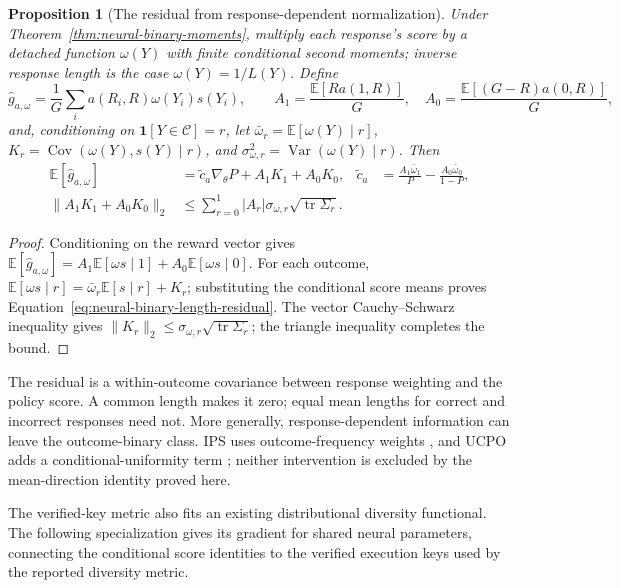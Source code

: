 \documentclass{article}
\newcommand{\enforcehalffinalproseline}{%
  \setlength{\parfillskip}{0pt plus .20\linewidth}}
\newcommand{\1}{\mathbf 1}
\newcommand{\E}{\mathbb E}
\newtheorem{proposition}[lemma]{Proposition}
\theoremstyle{remark}
\theoremstyle{definition}
\theoremstyle{plain}
\begin{document}
\begin{proposition}[The residual from response-dependent normalization]
\enforcehalffinalproseline
\label{prop:neural-binary-length-residual}
Under Theorem~\ref{thm:neural-binary-moments}, multiply each response's score
by a detached function $\omega(Y)$ with finite conditional second moments;
inverse response length is the case $\omega(Y)=1/L(Y)$. Define
\[
 \widehat g_{a,\omega}
 =\frac1G\sum_i a(R_i,R)\omega(Y_i)s(Y_i),\qquad
 A_1=\frac{\E[R a(1,R)]}{G},\quad
 A_0=\frac{\E[(G-R)a(0,R)]}{G},
\]
and, conditioning on $\1[Y\in\mathcal C]=r$, let
$\bar\omega_r=\E[\omega(Y)\mid r]$,
$K_r=\operatorname{Cov}(\omega(Y),s(Y)\mid r)$, and
$\sigma_{\omega,r}^2=\operatorname{Var}(\omega(Y)\mid r)$.
Then
\begin{align}
 \E[\widehat g_{a,\omega}]
 &=\widetilde c_a\nabla_\theta P+A_1K_1+A_0K_0,
 &\widetilde c_a&=\frac{A_1\bar\omega_1}{P}
                  -\frac{A_0\bar\omega_0}{1-P},
 \label{eq:neural-binary-length-residual}\\
 \|A_1K_1+A_0K_0\|_2
 &\le\sum_{r=0}^1|A_r|\sigma_{\omega,r}
                 \sqrt{\operatorname{tr}\Sigma_r}.
 \label{eq:neural-binary-length-bound}
\end{align}
\end{proposition}

\begin{proof}
\enforcehalffinalproseline
Conditioning on the reward vector gives
$\E[\widehat g_{a,\omega}]
=A_1\E[\omega s\mid1]+A_0\E[\omega s\mid0]$.
For each outcome, $\E[\omega s\mid r]
=\bar\omega_r\E[s\mid r]+K_r$; substituting the conditional score
means proves Equation~\eqref{eq:neural-binary-length-residual}.
The vector Cauchy--Schwarz inequality gives
$\|K_r\|_2\le\sigma_{\omega,r}\sqrt{\operatorname{tr}\Sigma_r}$;
the triangle inequality completes the bound.
\end{proof}

The residual is a within-outcome covariance between response weighting and
the policy score. A common length makes it zero; equal mean lengths for
correct and incorrect responses need not. More generally, response-dependent
information can leave the outcome-binary class. IPS uses outcome-frequency
weights \citep[Section~4.4, v1]{sinha2026expected}, and UCPO adds a
conditional-uniformity term \citep[Section~6, v1]{lochab2026ucpo}; neither
intervention is excluded by the mean-direction identity proved here.


The verified-key metric also fits an existing distributional diversity
functional. The following specialization gives its gradient for shared
neural parameters, connecting the conditional score identities to the
verified execution keys used by the reported diversity metric.
\end{document}
